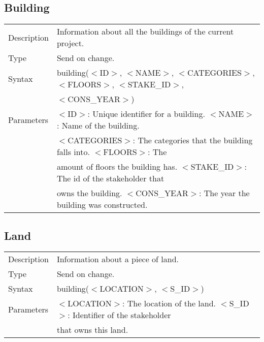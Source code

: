 \documentclass{article}
\begin{document}
\subsection*{Building}

\begin{tabular}{ l l }
  Description & Information about all the buildings of the current project.  \\
  Type & Send on change. \\
  Syntax & building($<$ID$>$, $<$NAME$>$, $<$CATEGORIES$>$, $<$FLOORS$>$, $<$STAKE\_ID$>$, \\
    & $<$CONS\_YEAR$>$) \\
  Parameters &  $<$ID$>$: Unique identifier for a building. $<$NAME$>$ : Name of the building. \\
    & $<$CATEGORIES$>$: The categories that the building falls into. $<$FLOORS$>$:  The \\
    & amount of floors the building has. $<$STAKE\_ID$>$: The id of the stakeholder that \\
    & owns the building. $<$CONS\_YEAR$>$: The year the building was constructed.
\end{tabular}

\subsection*{Land}

\begin{tabular}{ l l }
  Description & Information about a piece of land.  \\
  Type & Send on change. \\
  Syntax & building($<$LOCATION$>$, $<$S\_ID$>$) \\
  Parameters &  $<$LOCATION$>$: The location of the land. $<$S\_ID$>$: Identifier of the stakeholder \\
    &  that owns this land.
\end{tabular}
\end{document}
